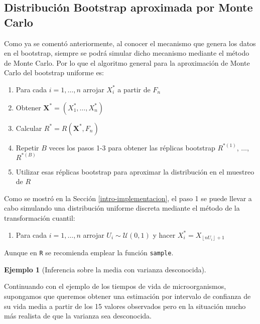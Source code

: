 \documentclass[
]{book}
\providecommand{\tightlist}{%
  \setlength{\itemsep}{0pt}\setlength{\parskip}{0pt}}
\theoremstyle{break}
\theoremstyle{definition}
\theoremstyle{definition}
\newtheorem{example}{Ejemplo}[chapter]
\theoremstyle{definition}
\theoremstyle{remark}
\begin{document}
\hypertarget{distribuciuxf3n-bootstrap-aproximada-por-monte-carlo}{%
\subsection{Distribución Bootstrap aproximada por Monte Carlo}\label{distribuciuxf3n-bootstrap-aproximada-por-monte-carlo}}

Como ya se comentó anteriormente,
al conocer el mecanismo que genera los datos en el bootstrap,
siempre se podrá simular dicho mecanismo mediante el método de Monte
Carlo. Por lo que el algoritmo general para la aproximación de Monte Carlo del
bootstrap uniforme es:

\begin{enumerate}
\def\labelenumi{\arabic{enumi}.}
\item
  Para cada \(i=1,\ldots ,n\) arrojar \(X_i^{\ast}\) a partir de \(F_n\)
\item
  Obtener \(\mathbf{X}^{\ast}=\left( X_1^{\ast},\ldots ,X_n^{\ast} \right)\)
\item
  Calcular \(R^{\ast}=R\left( \mathbf{X}^{\ast},F_n \right)\)
\item
  Repetir \(B\) veces los pasos 1-3 para obtener las réplicas bootstrap
  \(R^{\ast (1)}\), \(\ldots\), \(R^{\ast (B)}\)
\item
  Utilizar esas réplicas bootstrap para aproximar la distribución en el
  muestreo de \(R\)
\end{enumerate}

Como se mostró en la Sección \ref{intro-implementacion}, el paso 1 se puede llevar a cabo simulando una distribución uniforme discreta
mediante el método de la transformación cuantil:

\begin{enumerate}
\def\labelenumi{\arabic{enumi}.}
\tightlist
\item
  Para cada \(i=1,\ldots ,n\) arrojar \(U_i\sim \mathcal{U}\left( 0,1 \right)\) y
  hacer \(X_i^{\ast}=X_{\left\lfloor nU_i\right\rfloor +1}\)
\end{enumerate}

Aunque en \texttt{R} se recomienda emplear la función \texttt{sample}.

\begin{example}[Inferencia sobre la media con varianza desconocida]
\protect\hypertarget{exm:media-dt-desconocida}{}{\label{exm:media-dt-desconocida} \iffalse (Inferencia sobre la media con varianza desconocida) \fi{} } \vspace{0.5cm}

Continuando con el ejemplo de los tiempos de vida de microorganismos,
supongamos que queremos obtener una estimación por intervalo de confianza
de su vida media a partir de los 15 valores observados pero en la
situación mucho más realista de que la varianza sea desconocida.
\end{example}
\end{document}
